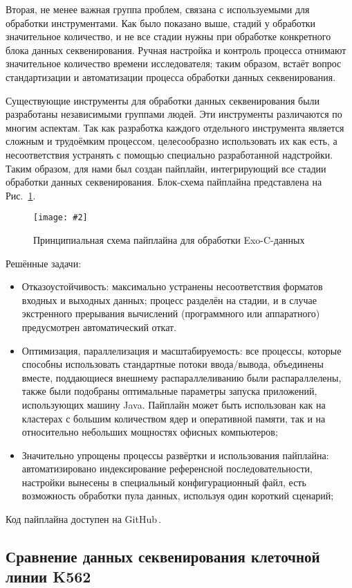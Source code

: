 \documentclass[a4paper,14pt]{extarticle}
\newcommand{\centerfigure}[5]
{\begin{figure}[#1]\centering\texttt{[image: \#2]}\caption{\label{#3}#4}\end{figure}}
\newcommand{\ecitep}[1]{\textenglish{\citep{#1}}}
\newcommand{\picref}[1]{Рис.~\ref{#1}}
\begin{document}
Вторая, не менее важная группа проблем, связана с используемыми для обработки инструментами.
Как было показано выше, стадий у обработки значительное количество, и не все стадии нужны при обработке конкретного блока данных секвенирования.
Ручная настройка и контроль процесса отнимают значительное количество времени исследователя;
таким образом, встаёт вопрос стандартизации и автоматизации процесса обработки данных секвенирования.

Существующие инструменты для обработки данных секвенирования были разработаны независимыми группами людей.
Эти инструменты различаются по многим аспектам.
Так как разработка каждого отдельного инструмента является сложным и трудоёмким процессом, целесообразно использовать их как есть, а несоответствия устранять с помощью специально разработанной надстройки.
Таким образом, для нами был создан пайплайн, интегрирующий все стадии обработки данных секвенирования.
Блок-схема пайплайна представлена на \picref{fig:pipeline}.

\centerfigure{h}{BlockScheme.pdf}{fig:pipeline}{Принципиальная схема пайплайна для обработки Exo-C-данных}{1}

Решённые задачи:

\begin{itemize}
	\item Отказоустойчивость: максимально устранены несоответствия форматов входных и выходных данных; процесс разделён на стадии, и в случае экстренного прерывания вычислений (программного или аппаратного) предусмотрен автоматический откат.
	\item Оптимизация, параллелизация и масштабируемость: все процессы, которые способны использовать стандартные потоки ввода/вывода, объединены вместе, поддающиеся внешнему распараллеливанию были распараллелены, также были подобраны оптимальные параметры запуска приложений, использующих машину Java.
	 Пайплайн может быть использован как на кластерах с большим количеством ядер и оперативной памяти, так и на относительно небольших мощностях офисных компьютеров;
	\item Значительно упрощены процессы развёртки и использования пайплайна: автоматизировано индексирование референсной последовательности, настройки вынесены в специальный конфигурационный файл, есть возможность обработки пула данных, используя один короткий сценарий;
\end{itemize}

Код пайплайна доступен на GitHub\,\ecitep{Scissors}.

\subsection{Сравнение данных секвенирования клеточной линии K562}
\end{document}
